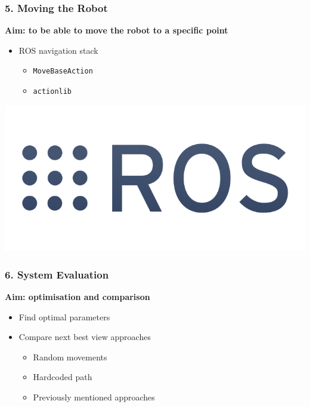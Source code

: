\begin{frame}[t] \frametitle{5. Moving the Robot}

	\textbf{Aim: to be able to move the robot to a specific point}

	\bigskip

	\begin{itemize}\itemsep16pt
		\item ROS navigation stack
		\medskip
		\begin{itemize}\itemsep10pt
			\item \texttt{MoveBaseAction}
			\item \texttt{actionlib}
		\end{itemize}
	\end{itemize}

	\vfill

	\flushright
	\includegraphics[width=0.8\linewidth]{src/ros.png}

	\vfill

\end{frame}


\begin{frame}[t] \frametitle{6. System Evaluation}

	\textbf{Aim: optimisation and comparison}

	\vfill

	\begin{itemize}\itemsep16pt
		\item Find optimal parameters
		\item Compare next best view approaches
		\medskip
		\begin{itemize}\itemsep10pt
			\item Random movements
			\item Hardcoded path
			\item Previously mentioned approaches
		\end{itemize}
	\end{itemize}

	\vfill

\end{frame}
